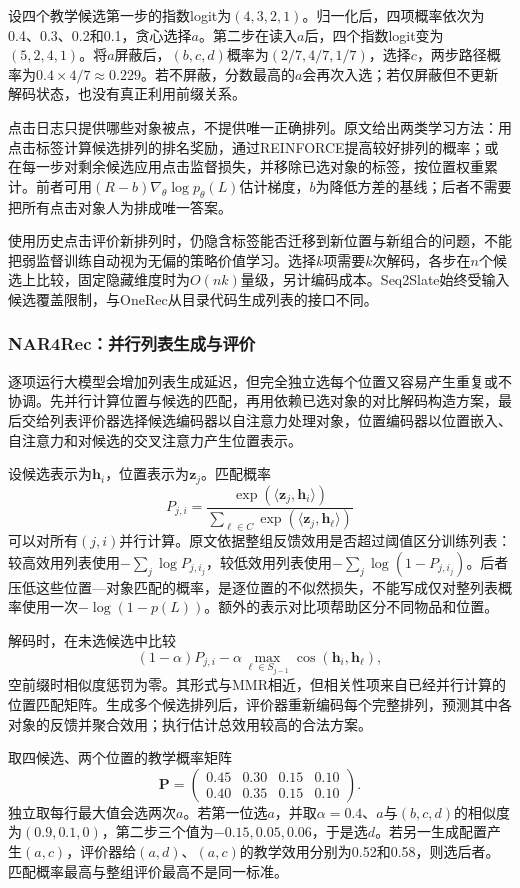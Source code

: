 设四个教学候选第一步的指数logit为$(4,3,2,1)$。归一化后，四项概率依次为0.4、0.3、0.2和0.1，贪心选择$a$。第二步在读入$a$后，四个指数logit变为$(5,2,4,1)$。将$a$屏蔽后，$(b,c,d)$概率为$(2/7,4/7,1/7)$，选择$c$，两步路径概率为$0.4\times4/7\approx0.229$。若不屏蔽，分数最高的$a$会再次入选；若仅屏蔽但不更新解码状态，也没有真正利用前缀关系。

点击日志只提供哪些对象被点，不提供唯一正确排列。原文给出两类学习方法：用点击标签计算候选排列的排名奖励，通过REINFORCE提高较好排列的概率；或在每一步对剩余候选应用点击监督损失，并移除已选对象的标签，按位置权重累计。前者可用$(R-b)\nabla_\theta\log p_\theta(L)$估计梯度，$b$为降低方差的基线；后者不需要把所有点击对象人为排成唯一答案。

使用历史点击评价新排列时，仍隐含标签能否迁移到新位置与新组合的问题，不能把弱监督训练自动视为无偏的策略价值学习。选择$k$项需要$k$次解码，各步在$n$个候选上比较，固定隐藏维度时为$O(nk)$量级，另计编码成本。Seq2Slate始终受输入候选覆盖限制，与OneRec从目录代码生成列表的接口不同。

\subsubsection{NAR4Rec：并行列表生成与评价}
\label{sec:rs-nar4rec}

逐项运行大模型会增加列表生成延迟，但完全独立选每个位置又容易产生重复或不协调。先并行计算位置与候选的匹配，再用依赖已选对象的对比解码构造方案，最后交给列表评价器选择候选编码器以自注意力处理对象，位置编码器以位置嵌入、自注意力和对候选的交叉注意力产生位置表示。

设候选表示为$\bm h_i$，位置表示为$\bm z_j$。匹配概率
\[
 P_{j,i}=\frac{\exp(\langle\bm z_j,\bm h_i\rangle)}
                  {\sum_{\ell\in C}\exp(\langle\bm z_j,\bm h_\ell\rangle)}
\]
可以对所有$(j,i)$并行计算。原文依据整组反馈效用是否超过阈值区分训练列表：较高效用列表使用$-\sum_j\log P_{j,i_j}$，较低效用列表使用$-\sum_j\log(1-P_{j,i_j})$。后者压低这些位置—对象匹配的概率，是逐位置的不似然损失，不能写成仅对整列表概率使用一次$-\log(1-p(L))$。额外的表示对比项帮助区分不同物品和位置。

解码时，在未选候选中比较
\[
 (1-\alpha)P_{j,i}
 -\alpha\max_{\ell\in S_{j-1}}
       \operatorname{cos}(\bm h_i,\bm h_\ell),
\]
空前缀时相似度惩罚为零。其形式与MMR相近，但相关性项来自已经并行计算的位置匹配矩阵。生成多个候选排列后，评价器重新编码每个完整排列，预测其中各对象的反馈并聚合效用；执行估计总效用较高的合法方案。

取四候选、两个位置的教学概率矩阵
\[
 \bm P=
 \begin{pmatrix}
  0.45&0.30&0.15&0.10\\
  0.40&0.35&0.15&0.10
 \end{pmatrix}.
\]
独立取每行最大值会选两次$a$。若第一位选$a$，并取$\alpha=0.4$、$a$与$(b,c,d)$的相似度为$(0.9,0.1,0)$，第二步三个值为$-0.15,0.05,0.06$，于是选$d$。若另一生成配置产生$(a,c)$，评价器给$(a,d)$、$(a,c)$的教学效用分别为0.52和0.58，则选后者。匹配概率最高与整组评价最高不是同一标准。

